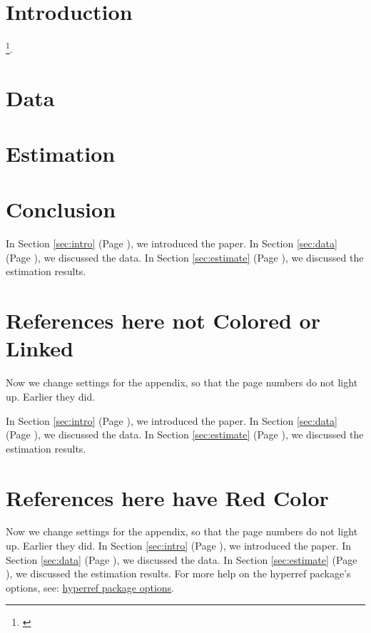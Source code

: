 \documentclass[12pt,english]{article}
\begin{document}
\section{Introduction\label{sec:intro}}
\blindtext\footnote{\autocite{conti_understanding_2010}}.

\section{Data\label{sec:data}}
\Blindtext

\section{Estimation\label{sec:estimate}}
\Blindtext

\section{Conclusion\label{sec:conclude}}

In Section \ref{sec:intro} (Page \pageref{sec:intro}), we introduced the paper. In Section \ref{sec:data} (Page \pageref{sec:data}), we discussed the data. In Section \ref{sec:estimate} (Page \pageref{sec:estimate}), we discussed the estimation results.
\blindtext

\pagebreak
\appendix

\section{References here not Colored or Linked}
\begingroup
{\hypersetup{hidelinks=true}
Now we change settings for the appendix, so that the page numbers do not light up. Earlier they did.

In Section \ref{sec:intro} (Page \pageref{sec:intro}), we introduced the paper. In Section \ref{sec:data} (Page \pageref{sec:data}), we discussed the data. In Section \ref{sec:estimate} (Page \pageref{sec:estimate}), we discussed the estimation results.
}
\endgroup

\section{References here have Red Color}
\begingroup
{\hypersetup{colorlinks=true, linkcolor=red, citecolor=red, plainpages=false, pdfpagelabels=true, urlcolor=red}
	Now we change settings for the appendix, so that the page numbers do not light up. Earlier they did.
	In Section \ref{sec:intro} (Page \pageref{sec:intro}), we introduced the paper. In Section \ref{sec:data} (Page \pageref{sec:data}), we discussed the data. In Section \ref{sec:estimate} (Page \pageref{sec:estimate}), we discussed the estimation results. For more help on the hyperref package's options, see: \href{http://mirror.utexas.edu/ctan/macros/latex/contrib/hyperref/doc/options.pdf}{hyperref package options}.
}
\endgroup



\pagebreak
\begingroup
\setlength\bibitemsep{0pt}
\printbibliography
\endgroup
\pagebreak
\end{document}
